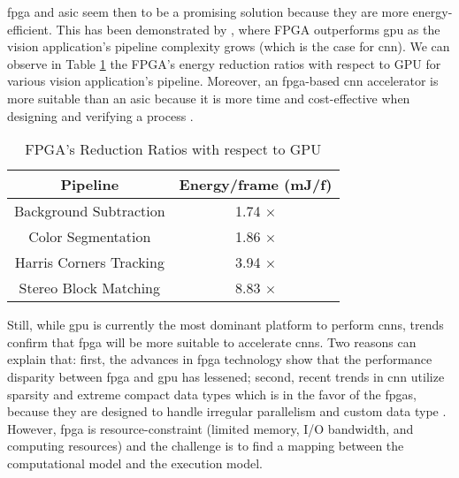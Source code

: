 \acrshort{fpga} and \acrshort{asic} seem then to be a promising solution because they are more energy-efficient. This has been demonstrated by \textcite{qasaimeh_comparing_2019}, where FPGA outperforms \acrshort{gpu} as the vision application’s pipeline complexity grows (which is the case for \acrshort{cnn}). We can observe in Table \ref{tab:benchener} the FPGA’s energy reduction ratios with respect to GPU for various vision application’s pipeline. Moreover, an \acrshort{fpga}-based \acrshort{cnn} accelerator is more suitable than an \acrshort{asic} because it is more time and cost-effective when designing and verifying a process \cite{motamedi_placid_2017}.
%
\begin{table}
    \center
    \begin{tabular}{|c|c|}
        \hline
        Pipeline & Energy/frame (mJ/f) \\
        \hline
        Background Subtraction & 1.74 $\times$\\
        \hline
        Color Segmentation & 1.86 $\times$ \\
        \hline
        Harris Corners Tracking & 3.94 $\times$ \\
        \hline
        Stereo Block Matching & 8.83 $\times$ \\
        \hline
    \end{tabular}
    \caption{FPGA’s Reduction Ratios with respect to GPU \cite{qasaimeh_comparing_2019}}
    \label{tab:benchener}
\end{table}

Still, while \acrshort{gpu} is currently the most dominant platform to perform \acrshort{cnn}s, trends confirm that \acrshort{fpga} will be more suitable to accelerate \acrshort{cnn}s. Two reasons can explain that: first, the advances in \acrshort{fpga} technology show that the performance disparity between \acrshort{fpga} and \acrshort{gpu} has lessened; second, recent trends in \acrshort{cnn} utilize sparsity and extreme compact data types which is in the favor of the \acrshort{fpga}s, because they are designed to handle irregular parallelism and custom data type \cite{nurvitadhi_can_2017}. However, \acrshort{fpga} is resource-constraint (limited memory, I/O bandwidth, and computing resources) and the challenge is to find a mapping between the computational model and the execution model.

